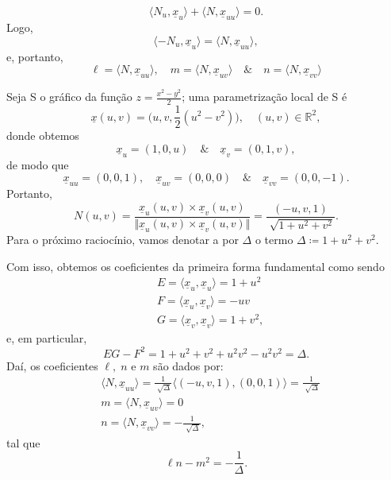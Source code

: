 \documentclass[../differential_geometry.tex]{subfiles}
\begin{document}
\[
	\langle N_u, \underline{x}_u \rangle + \langle N, \underline{x}_{uu} \rangle = 0.
\]
Logo,
\[
	\langle -N_u, \underline{x}_u \rangle = \langle N, \underline{x}_{uu} \rangle,
\]
e, portanto,
\[
	\boxed{\ell = \langle N, \underline{x}_{uu} \rangle}, \quad  \boxed{m = \langle N, \underline{x}_{uv} \rangle} \quad\&\quad \boxed{n = \langle N, \underline{x}_{vv} \rangle}
\]
\begin{example}
	Seja S o gráfico da função \(z = \frac{x^{2}-y^{2}}{2}\); uma parametrização local de S é
	\[
		\underline{x}(u, v) = \biggl(u, v, \frac{1}{2}(u^{2}-v^{2})\biggr), \quad (u, v)\in \mathbb{R}^{2},
	\]
	donde obtemos
	\[
		\underline{x}_u = (1, 0, u) \quad\&\quad \underline{x}_v = (0, 1, v),
	\]
	de modo que
	\[
		\underline{x}_{uu} = (0, 0, 1), \quad \underline{x}_{uv} = (0, 0, 0) \quad\&\quad \underline{x}_{vv} = (0, 0, -1).
	\]
	Portanto,
	\[
		N(u, v) = \frac{\underline{x}_u(u, v)\times \underline{x}_v(u, v)}{\Vert \underline{x}_u(u, v)\times \underline{x}_v(u, v) \Vert} = \frac{(-u, v, 1)}{\sqrt[]{1+u^{2}+v^{2}}}.
	\]
	Para o próximo raciocínio, vamos denotar a por \(\Delta \) o termo \(\Delta \coloneqq 1+u^{2}+v^{2}\).

	Com isso, obtemos os coeficientes da primeira forma fundamental como sendo
	\begin{align*}
		 & E = \langle \underline{x}_u, \underline{x}_u \rangle  = 1+u^{2}  \\
		 & F = \langle \underline{x}_u, \underline{x}_v \rangle  = -uv      \\
		 & G = \langle \underline{x}_v, \underline{x}_v \rangle  = 1+v^{2},
	\end{align*}
	e, em particular,
	\[
		EG - F^{2} = 1 + u^{2} + v^{2} + u^{2}v^{2}-u^{2}v^{2} = \Delta.
	\]
	Daí, os coeficientes \(\ell ,\; n\) e \(m\) são dados por:
	\begin{align*}
		 & \langle N, \underline{x}_{uu} \rangle = \frac{1}{\sqrt[]{\Delta }}\langle (-u, v, 1),(0, 0, 1)  \rangle = \frac{1}{\sqrt[]{\Delta }} \\
		 & m = \langle N, \underline{x}_{uv} \rangle = 0                                                                                        \\
		 & n = \langle N, \underline{x}_{vv} \rangle = - \frac{1}{\sqrt[]{\Delta }},
	\end{align*}
	tal que
	\[
		\ell n - m^{2} = - \frac{1}{\Delta }.
	\]


\end{example}
\end{document}
